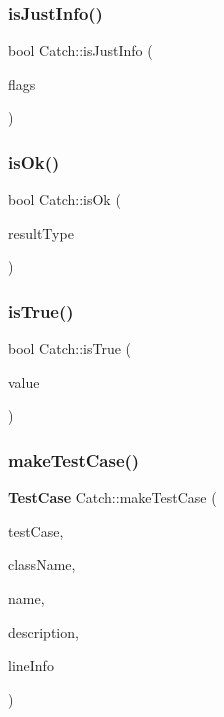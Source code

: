 \mbox{\label{namespace_catch_a54b01af61673a3e1f21f31713639b180}} 
\subsubsection{is\+Just\+Info()}
{\footnotesize\ttfamily bool Catch\+::is\+Just\+Info (\begin{DoxyParamCaption}\item[{int}]{flags }\end{DoxyParamCaption})\hspace{0.3cm}{\ttfamily [inline]}}

\mbox{\label{namespace_catch_a5205869c81c06d3460759cb86676ae68}} 
\subsubsection{is\+Ok()}
{\footnotesize\ttfamily bool Catch\+::is\+Ok (\begin{DoxyParamCaption}\item[{\textbf{ Result\+Was\+::\+Of\+Type}}]{result\+Type }\end{DoxyParamCaption})\hspace{0.3cm}{\ttfamily [inline]}}

\mbox{\label{namespace_catch_ae3bc6c6677e64e6eaa720dc3add31852}} 
\subsubsection{is\+True()}
{\footnotesize\ttfamily bool Catch\+::is\+True (\begin{DoxyParamCaption}\item[{bool}]{value }\end{DoxyParamCaption})\hspace{0.3cm}{\ttfamily [inline]}}

\mbox{\label{namespace_catch_a2a784590bb5068810d3f6013fed1f1d3}} 
\subsubsection{make\+Test\+Case()}
{\footnotesize\ttfamily \textbf{ Test\+Case} Catch\+::make\+Test\+Case (\begin{DoxyParamCaption}\item[{\textbf{ I\+Test\+Case} $\ast$}]{test\+Case,  }\item[{std\+::string const \&}]{class\+Name,  }\item[{std\+::string const \&}]{name,  }\item[{std\+::string const \&}]{description,  }\item[{\textbf{ Source\+Line\+Info} const \&}]{line\+Info }\end{DoxyParamCaption})}

